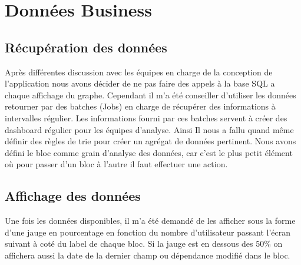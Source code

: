 \section{Données Business}

\subsection{Récupération des données}
Après différentes discussion avec les équipes en charge de la conception de l’application nous avons décider de ne pas faire des appels à la base SQL a chaque affichage du graphe.
Cependant il m'a été conseiller d'utiliser les données retourner par des batches (Jobs) en charge de récupérer des informations à intervalles régulier. Les informations fourni par ces batches servent à créer des dashboard régulier pour les équipes d'analyse. Ainsi Il nous a fallu quand même définir des règles de trie pour créer un agrégat de données pertinent. Nous avons défini le bloc comme grain d'analyse des données, car c'est le plus petit élément où pour passer d'un bloc à l'autre il faut effectuer une action.

\subsection{Affichage des données}
Une fois les données disponibles, il m'a été demandé de les afficher sous la forme d'une jauge en pourcentage en fonction du nombre d'utilisateur passant l'écran suivant à coté du label de chaque bloc. Si la jauge est en dessous des 50\% on affichera aussi la date de la dernier champ ou dépendance modifié dans le bloc.